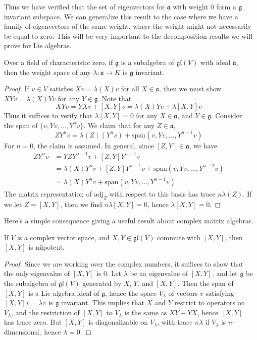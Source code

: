 Thus we have verified that the set of eigenvectors for $\mathfrak{a}$ with weight 0 form a $\mathfrak{g}$ invariant subspace. We can generalize this result to the case where we have a family of eigenvectors of the same weight, where the weight might not necessarily be equal to zero. This will be very important to the decomposition results we will prove for Lie algebras.

\begin{theorem}
    Over a field of characteristic zero, if $\mathfrak{g}$ is a subalgebra of $\mathfrak{gl}(V)$ with ideal $\mathfrak{a}$, then the weight space of any $\lambda: \mathfrak{a} \to K$ is $\mathfrak{g}$ invariant.
\end{theorem}
\begin{proof}
    If $v \in V$ satisfies $Xv = \lambda(X)v$ for all $X \in \mathfrak{a}$, then we must show $XYv = \lambda(X)Yv$ for any $Y \in \mathfrak{g}$. Note that
    \[ XYv = YXv + [X,Y]v = \lambda(X) Yv + \lambda[X,Y] v \]
    Thus it suffices to verify that $\lambda[X,Y] = 0$ for any $X \in \mathfrak{a}$, and $Y \in \mathfrak{g}$. Consider the span of $\{ v, Yv, \dots, Y^nv \}$. We claim that for any $Z \in \mathfrak{a}$,
    \[ ZY^n v = \lambda(Z) (Y^n v) + \text{span}(v,Yv, \dots, Y^{n-1}v) \]
    For $n = 0$, the claim is assumed. In general, since $[Z,Y] \in \mathfrak{a}$, we have
    \begin{align*}
        ZY^nv &= YZY^{n-1}v + [Z,Y]Y^{n-1}v\\
        &= \lambda(X) Y^n v + [Z,Y]Y^{n-1}v + \text{span}(v,Yv, \dots, Y^{n-2}v)\\
        &= \lambda(X) Y^n v + \text{span}(v,Yv, \dots, Y^{n-1}v)
    \end{align*}
    The matrix representation of $\text{adj}_Z$ with respect to this basis has trace $n\lambda(Z)$. If we let $Z = [X,Y]$, then we find $n\lambda[X,Y] = 0$, hence $\lambda[X,Y] = 0$.
\end{proof}

Here's a simple consequence giving a useful result about complex matrix algebras.

\begin{theorem}
    If $V$ is a complex vector space, and $X, Y \in \mathfrak{gl}(V)$ commute with $[X,Y]$, then $[X,Y]$ is nilpotent.
\end{theorem}
\begin{proof}
    Since we are working over the complex numbers, it suffices to show that the only eigenvalue of $[X,Y]$ is 0. Let $\lambda$ be an eigenvalue of $[X,Y]$, and let $\mathfrak{g}$ be the subalgebra of $\mathfrak{gl}(V)$ generated by $X$, $Y$, and $[X,Y]$. Then the span of $[X,Y]$ is a Lie algebra ideal of $\mathfrak{g}$, hence the space $V_\lambda$ of vectors $v$ satisfying $[X,Y]v = \lambda v$ is $\mathfrak{g}$ invariant. This implies that $X$ and $Y$ restrict to operators on $V_\lambda$, and the restriction of $[X,Y]$ to $V_\lambda$ is the same as $XY - YX$, hence $[X,Y]$ has trace zero. But $[X,Y]$ is diagonalizable on $V_\lambda$, with trace $n \lambda$ if $V_\lambda$ is $n$-dimensional, hence $\lambda = 0$.
\end{proof}

